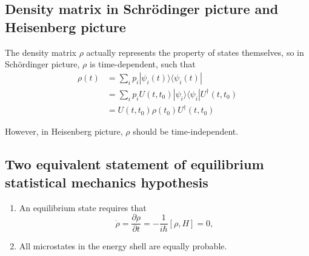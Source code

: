 \documentclass[10pt]{article}
\begin{document}
\subsection{Density matrix in Schr\"{o}dinger picture and Heisenberg picture}

The density matrix $\rho$ actually represents the property of states themselves, so in Sch\"{o}rdinger picture, $\rho$ is time-dependent, such that
\begin{align*}
\rho(t) &= \sum_i p_i |\psi_i(t) \rangle \langle \psi_i (t) | \\
&= \sum_i p_i U(t,t_0)|\psi_i \rangle \langle \psi_i |U^{\dagger}(t,t_0)\\
&= U(t,t_0) \rho(t_0) U^{\dagger}(t,t_0)
\end{align*}

However, in Heisenberg picture, $\rho$ should be time-independent.

\subsection{Two equivalent statement of equilibrium statistical mechanics hypothesis}

\begin{enumerate}
	\item An equilibrium state requires that
		\begin{equation}
			\dot{\rho} = \frac{\partial \rho}{\partial t} = -\frac{1}{i \hbar}[\rho, H] = 0,
		\end{equation}
	\item All microstates in the energy shell are equally probable.
\end{enumerate}
\end{document}
